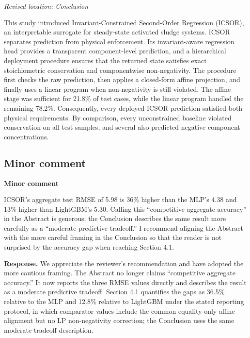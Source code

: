 \documentclass[11pt,a4paper]{article}
\newcommand{\excerptlocation}[1]{\par\noindent\textit{Revised location: #1}\par}
\begin{document}
\excerptlocation{Conclusion}
\begin{revisionexcerpt}
This study introduced Invariant-Constrained Second-Order Regression (ICSOR), an interpretable surrogate for steady-state activated sludge systems. ICSOR separates prediction from physical enforcement. Its invariant-aware regression head provides a transparent component-level prediction, and a hierarchical deployment procedure ensures that the returned state satisfies exact stoichiometric conservation and componentwise non-negativity. The procedure first checks the raw prediction, then applies a closed-form affine projection, and finally uses a linear program when non-negativity is still violated. The affine stage was sufficient for 21.8\% of test cases, while the linear program handled the remaining 78.2\%. Consequently, every deployed ICSOR prediction satisfied both physical requirements. By comparison, every unconstrained baseline violated conservation on all test samples, and several also predicted negative component concentrations.
\end{revisionexcerpt}

\subsection*{Minor comment}

\begin{reviewercomment}
\textbf{Minor comment}

ICSOR's aggregate test RMSE of 5.98 is 36\% higher than the MLP's 4.38 and 13\% higher than LightGBM's 5.30. Calling this ``competitive aggregate accuracy'' in the Abstract is generous; the Conclusion describes the same result more carefully as a ``moderate predictive tradeoff.'' I recommend aligning the Abstract with the more careful framing in the Conclusion so that the reader is not surprised by the accuracy gap when reaching Section 4.1.
\end{reviewercomment}

\noindent\textbf{Response.} We appreciate the reviewer's recommendation and have adopted the more cautious framing. The Abstract no longer claims ``competitive aggregate accuracy.'' It now reports the three RMSE values directly and describes the result as a moderate predictive tradeoff. Section 4.1 quantifies the gaps as 36.5\% relative to the MLP and 12.8\% relative to LightGBM under the stated reporting protocol, in which comparator values include the common equality-only affine alignment but no LP non-negativity correction; the Conclusion uses the same moderate-tradeoff description.
\end{document}
